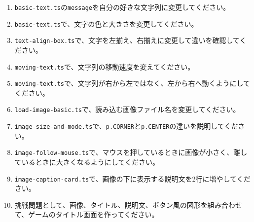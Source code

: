 \begin{enumerate}
    \item \texttt{basic-text.ts}の\texttt{message}を自分の好きな文字列に変更してください。
    \item \texttt{basic-text.ts}で、文字の色と大きさを変更してください。
    \item \texttt{text-align-box.ts}で、文字を左揃え、右揃えに変更して違いを確認してください。
    \item \texttt{moving-text.ts}で、文字列の移動速度を変えてください。
    \item \texttt{moving-text.ts}で、文字列が右から左ではなく、左から右へ動くようにしてください。
    \item \texttt{load-image-basic.ts}で、読み込む画像ファイル名を変更してください。
    \item \texttt{image-size-and-mode.ts}で、\texttt{p.CORNER}と\texttt{p.CENTER}の違いを説明してください。
    \item \texttt{image-follow-mouse.ts}で、マウスを押しているときに画像が小さく、離しているときに大きくなるようにしてください。
    \item \texttt{image-caption-card.ts}で、画像の下に表示する説明文を2行に増やしてください。
    \item 挑戦問題として、画像、タイトル、説明文、ボタン風の図形を組み合わせて、ゲームのタイトル画面を作ってください。
\end{enumerate}

